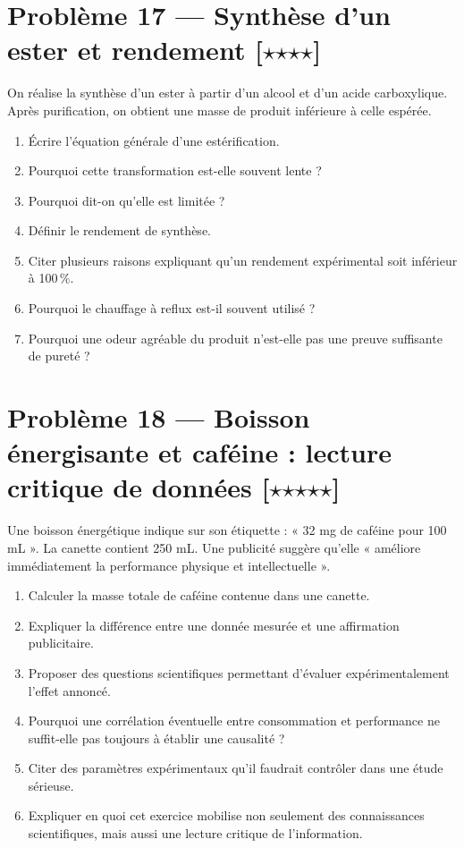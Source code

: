 \documentclass[11pt,a4paper]{article}
\newcommand{\etoile}{\ensuremath{\star}}
\begin{document}
\section*{Problème 17 --- Synthèse d'un ester et rendement \hfill [\etoile\etoile\etoile\etoile]}

On réalise la synthèse d'un ester à partir d'un alcool et d'un acide carboxylique. Après purification, on obtient une masse de produit inférieure à celle espérée.

\begin{enumerate}[label=\arabic*)]
    \item Écrire l'équation générale d'une estérification.
    \item Pourquoi cette transformation est-elle souvent lente ?
    \item Pourquoi dit-on qu'elle est limitée ?
    \item Définir le rendement de synthèse.
    \item Citer plusieurs raisons expliquant qu'un rendement expérimental soit inférieur à 100\,\%.
    \item Pourquoi le chauffage à reflux est-il souvent utilisé ?
    \item Pourquoi une odeur agréable du produit n'est-elle pas une preuve suffisante de pureté ?
\end{enumerate}

\section*{Problème 18 --- Boisson énergisante et caféine : lecture critique de données \hfill [\etoile\etoile\etoile\etoile\etoile]}

Une boisson énergétique indique sur son étiquette : « 32 mg de caféine pour 100 mL ». La canette contient 250 mL.
Une publicité suggère qu'elle « améliore immédiatement la performance physique et intellectuelle ».

\begin{enumerate}[label=\arabic*)]
    \item Calculer la masse totale de caféine contenue dans une canette.
    \item Expliquer la différence entre une donnée mesurée et une affirmation publicitaire.
    \item Proposer des questions scientifiques permettant d'évaluer expérimentalement l'effet annoncé.
    \item Pourquoi une corrélation éventuelle entre consommation et performance ne suffit-elle pas toujours à établir une causalité ?
    \item Citer des paramètres expérimentaux qu'il faudrait contrôler dans une étude sérieuse.
    \item Expliquer en quoi cet exercice mobilise non seulement des connaissances scientifiques, mais aussi une lecture critique de l'information.
\end{enumerate}
\end{document}

